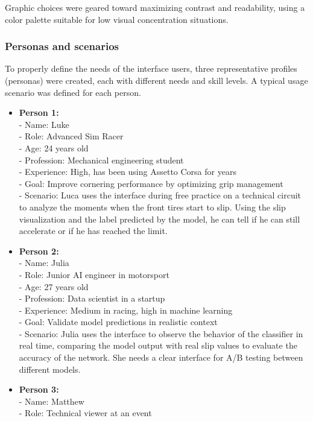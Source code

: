 \documentclass[a4paper,final,12pt]{report}
\begin{document}
Graphic choices were geared toward maximizing contrast and readability, using a color palette suitable for low visual concentration situations.

\subsubsection{Personas and scenarios}
To properly define the needs of the interface users, three representative profiles (personas) were created, each with different needs and skill levels. A typical usage scenario was defined for each person.
\begin{itemize}
    \item \textbf{Person 1:} \\
    - Name: Luke\\
    - Role: Advanced Sim Racer\\
    - Age: 24 years old\\
    - Profession: Mechanical engineering student\\
    - Experience: High, has been using Assetto Corsa for years\\
    - Goal: Improve cornering performance by optimizing grip management\\
    - Scenario: Luca uses the interface during free practice on a technical circuit to analyze the moments when the front tires start to slip. Using the slip visualization and the label predicted by the model, he can tell if he can still accelerate or if he has reached the limit.
    \item \textbf{Person 2:}\\
    - Name: Julia\\ 
    - Role: Junior AI engineer in motorsport\\
    - Age: 27 years old\\
    - Profession: Data scientist in a startup\\
    - Experience: Medium in racing, high in machine learning\\
    - Goal: Validate model predictions in realistic context\\
    - Scenario: Julia uses the interface to observe the behavior of the classifier in real time, comparing the model output with real slip values to evaluate the accuracy of the network. She needs a clear interface for A/B testing between different models.
    \item \textbf{Person 3:}\\
    - Name: Matthew\\ 
    - Role: Technical viewer at an event\\

\end{itemize}
\end{document}
